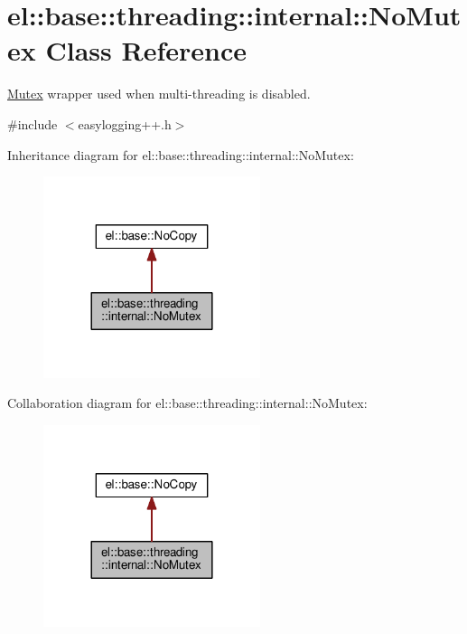 \hypertarget{classel_1_1base_1_1threading_1_1internal_1_1_no_mutex}{}\section{el\+:\+:base\+:\+:threading\+:\+:internal\+:\+:No\+Mutex Class Reference}
\label{classel_1_1base_1_1threading_1_1internal_1_1_no_mutex}


\hyperlink{class_mutex}{Mutex} wrapper used when multi-\/threading is disabled.  




{\ttfamily \#include $<$easylogging++.\+h$>$}



Inheritance diagram for el\+:\+:base\+:\+:threading\+:\+:internal\+:\+:No\+Mutex\+:
\nopagebreak
\begin{figure}[H]
\begin{center}
\leavevmode
\includegraphics[width=180pt]{classel_1_1base_1_1threading_1_1internal_1_1_no_mutex__inherit__graph}
\end{center}
\end{figure}


Collaboration diagram for el\+:\+:base\+:\+:threading\+:\+:internal\+:\+:No\+Mutex\+:
\nopagebreak
\begin{figure}[H]
\begin{center}
\leavevmode
\includegraphics[width=180pt]{classel_1_1base_1_1threading_1_1internal_1_1_no_mutex__coll__graph}
\end{center}
\end{figure}
